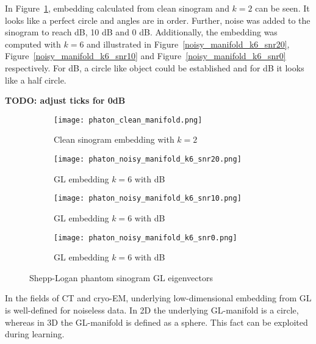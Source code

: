 In Figure~\ref{fig:clean_manifold}, embedding calculated from clean sinogram and $k=2$ can be seen.
It looks like a perfect circle and angles are in order. 
Further, noise was added to the sinogram to reach  dB, 10 dB and 0 dB. 
Additionally, the embedding was computed with $k=6$ and illustrated in Figure~\ref{noisy_manifold_k6_snr20}, Figure~\ref{noisy_manifold_k6_snr10}
and Figure~\ref{noisy_manifold_k6_snr0} respectively.
For  dB, a circle like object could be established and for  dB it looks like a half circle. 

\textbf{TODO: adjust ticks for 0dB}

\begin{figure}[H]
    \captionsetup[subfigure]{justification=centering}
    \centering
    \begin{subfigure}[t]{0.25\textwidth}
        \texttt{[image: phaton\_clean\_manifold.png]}
        \caption{Clean sinogram embedding with $k=2$}
        \label{fig:clean_manifold}
    \end{subfigure}\hfill
    \begin{subfigure}[t]{0.25\textwidth}
      \texttt{[image: phaton\_noisy\_manifold\_k6\_snr20.png]}
      \caption{GL embedding $k=6$ with  dB}
      \label{fig:noisy_manifold_k6_snr20}
    \end{subfigure}\hfill
    \begin{subfigure}[t]{0.25\textwidth}
      \texttt{[image: phaton\_noisy\_manifold\_k6\_snr10.png]}
      \caption{GL embedding $k=6$ with  dB}
      \label{fig:noisy_manifold_k6_snr10}
    \end{subfigure}\hfill
    \begin{subfigure}[t]{0.25\textwidth}
      \texttt{[image: phaton\_noisy\_manifold\_k6\_snr0.png]}
      \caption{GL embedding $k=6$ with  dB}
      \label{fig:noisy_manifold_k6_snr0}
    \end{subfigure}
    \caption{Shepp-Logan phantom sinogram GL eigenvectors}
    \label{fig:phantom_manifolds}
  \end{figure}

\begin{tcolorbox}[colback=red!5!white,colframe=red!75!black]
    In the fields of CT and cryo-EM, underlying low-dimensional embedding from GL is well-defined for noiseless data.
    In 2D the underlying GL-manifold is a circle, whereas in 3D the GL-manifold is defined as a sphere.
    This fact can be exploited during learning.
\end{tcolorbox}

